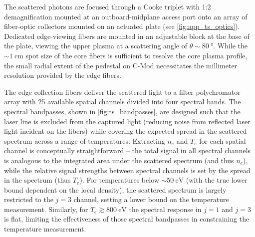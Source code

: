 The scattered photons are focused through a Cooke triplet with 1:2 demagnification mounted at an outboard-midplane access port onto an array of fiber-optic collectors mounted on an actuated plate (see \cref{fig:app_ts_optics}).  Dedicated edge-viewing fibers are mounted in an adjustable block at the base of the plate, viewing the upper plasma at a scattering angle of $\theta \sim \SI{80}{\degree}$.  While the $\sim\SI{1}{\centi\meter}$ spot size of the core fibers is sufficient to resolve the core plasma profile, the small radial extent of the pedestal on C-Mod necessitates the millimeter resolution provided by the edge fibers.

\begin{figure}[t]
 \pushtooutside
\end{figure}

The edge collection fibers deliver the scattered light to a filter polychromator array with 25 available spatial channels divided into four spectral bands.  The spectral bandpasses, shown in \cref{fig:ts_bandpasses}, are designed such that the laser line is excluded from the captured light (reducing noise from reflected laser light incident on the fibers) while covering the expected spread in the scattered spectrum across a range of temperatures.  Extracting $n_e$ and $T_e$ for each spatial channel is conceptually straightforward -- the total signal in all spectral channels is analogous to the integrated area under the scattered spectrum (and thus $n_e$), while the relative signal strengths between spectral channels is set by the spread in the spectrum (thus $T_e$).  For temperatures below $\sim\SI{50}{\electronvolt}$ (with the true lower bound dependent on the local density), the scattered spectrum is largely restricted to the $j=3$ channel, setting a lower bound on the temperature measurement.  Similarly, for $T_e \gtrsim \SI{800}{\electronvolt}$ the spectral response in $j=1$ and $j=3$ is flat, limiting the effectiveness of those spectral bandpasses in constraining the temperature measurement.


